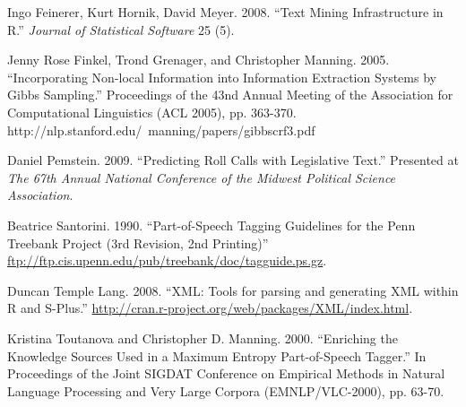 \documentclass[11pt]{article}
\begin{document}
\begin{thebibliography}{9}
 
  Ingo Feinerer, Kurt Hornik, David Meyer.
  2008.
  ``Text Mining Infrastructure in R.''
  \emph{Journal of Statistical Software} 25 (5).

  Jenny Rose Finkel, Trond Grenager, and Christopher Manning.
  2005.
  ``Incorporating Non-local Information into Information Extraction
  Systems by Gibbs Sampling.'' 
  Proceedings of the 43nd Annual Meeting of the Association for 
  Computational Linguistics (ACL 2005), pp.  363-370.
  http://nlp.stanford.edu/~manning/papers/gibbscrf3.pdf

  Daniel Pemstein.
  2009.
  ``Predicting Roll Calls with Legislative Text.''
  Presented at \emph{The 67th Annual National Conference of the
  Midwest Political Science Association}.

  Beatrice Santorini.  1990. ``Part-of-Speech Tagging Guidelines for the
  Penn Treebank Project (3rd Revision, 2nd Printing)''
  \url{ftp://ftp.cis.upenn.edu/pub/treebank/doc/tagguide.ps.gz}.

  Duncan Temple Lang.
  2008.
  ``XML: Tools for parsing and generating XML within R and S-Plus.''
  \url{http://cran.r-project.org/web/packages/XML/index.html}.

  Kristina Toutanova and Christopher D. Manning. 
  2000. 
  ``Enriching the
  Knowledge Sources Used in a Maximum Entropy Part-of-Speech
  Tagger.''  
  In Proceedings of the Joint SIGDAT Conference on Empirical
  Methods in Natural Language Processing and Very Large Corpora
  (EMNLP/VLC-2000), pp. 63-70.
 
\end{thebibliography}
\end{document}
